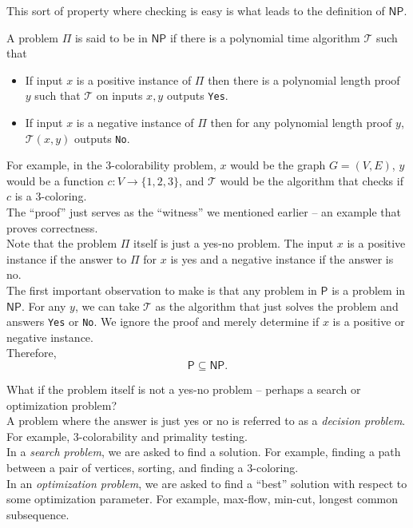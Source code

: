 	This sort of property where checking is easy is what leads to the definition of $\mathsf{NP}$.

	\begin{fdef}
		A problem $\mathsf{\Pi}$ is said to be in $\mathsf{NP}$ if there is a polynomial time algorithm $\mathcal{T}$ such that
		\begin{itemize}
			\item If input $x$ is a positive instance of $\mathsf{\Pi}$ then there is a polynomial length proof $y$ such that $\mathcal{T}$ on inputs $x,y$ outputs \texttt{Yes}.
			\item If input $x$ is a negative instance of $\mathsf{\Pi}$ then for any polynomial length proof $y$, $\mathcal{T}(x,y)$ outputs \texttt{No}.
		\end{itemize}
	\end{fdef}

	For example, in the $3$-colorability problem, $x$ would be the graph $G=(V,E)$, $y$ would be a function $c:V\to\{1,2,3\}$, and $\mathcal{T}$ would be the algorithm that checks if $c$ is a $3$-coloring.\\
	The ``proof'' just serves as the ``witness'' we mentioned earlier -- an example that proves correctness.\\

	Note that the problem $\mathsf{\Pi}$ itself is just a yes-no problem. The input $x$ is a positive instance if the answer to $\mathsf{\Pi}$ for $x$ is yes and a negative instance if the answer is no.\\

	The first important observation to make is that any problem in $\mathsf{P}$ is a problem in $\mathsf{NP}$. For any $y$, we can take $\mathcal{T}$ as the algorithm that just solves the problem and answers \texttt{Yes} or \texttt{No}. We ignore the proof and merely determine if $x$ is a positive or negative instance.\\
	Therefore,
	\[ \mathsf{P} \subseteq \mathsf{NP}. \]

	What if the problem itself is not a yes-no problem -- perhaps a search or optimization problem?\\
	A problem where the answer is just yes or no is referred to as a \textit{decision problem}. For example, $3$-colorability and primality testing.\\
	In a \textit{search problem}, we are asked to find a solution. For example, finding a path between a pair of vertices, sorting, and finding a $3$-coloring.\\
	In an \textit{optimization problem}, we are asked to find a ``best'' solution with respect to some optimization parameter. For example, max-flow, min-cut, longest common subsequence.\\

